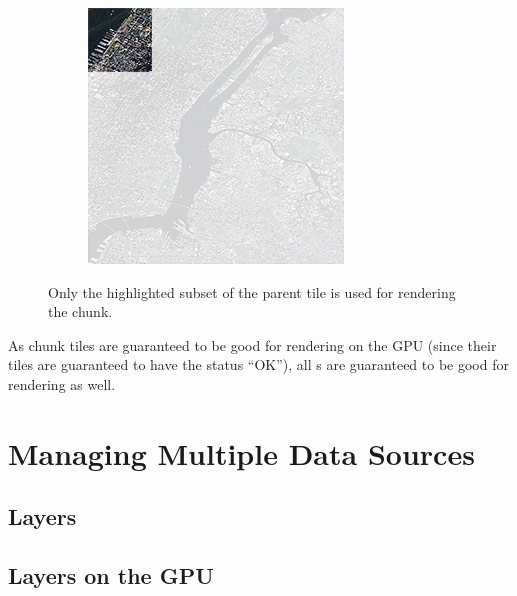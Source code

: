 \begin{figure}[htbp]
\begin{subfigure}[t]{0.3\textwidth}
    \end{subfigure}
    \quad
    \begin{subfigure}[t]{0.3\textwidth}
        \includegraphics[width=\textwidth]{figures/implementation/chunktile/chunktilepile1.png}
    \end{subfigure}
    \caption{Only the highlighted subset of the parent tile is used for rendering the chunk.}
    \label{fig:chunktilepile}
\end{figure}

As chunk tiles are guaranteed to be good for rendering on the GPU (since their tiles are guaranteed to have the status ``OK''), all s are guaranteed to be good for rendering as well. 

\section{Managing Multiple Data Sources}

\subsection{Layers}

\subsection{Layers on the GPU}

